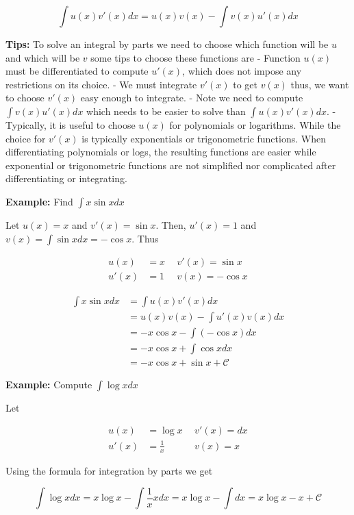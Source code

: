 \documentclass[11pt]{article}
\begin{document}
{\[
\int u(x)v'(x) dx = u(x)v(x) - \int v(x)u'(x)dx
\]

\textbf{Tips:} To solve an integral by parts we need to choose which
function will be \(u\) and which will be \(v\) some tips to choose these
functions are - Function \(u(x)\) must be differentiated to compute
\(u'(x)\), which does not impose any restrictions on its choice. - We
must integrate \(v'(x)\) to get \(v(x)\) thus, we want to choose
\(v'(x)\) easy enough to integrate. - Note we need to compute
\(\int v(x)u'(x)dx\) which needs to be easier to solve than
\(\int u(x)v'(x)dx\). - Typically, it is useful to choose \(u(x)\) for
polynomials or logarithms. While the choice for \(v'(x)\) is typically
exponentials or trigonometric functions. When differentiating
polynomials or logs, the resulting functions are easier while
exponential or trigonometric functions are not simplified nor
complicated after differentiating or integrating.

\textbf{Example:} Find \(\int x\sin x dx\)

Let \(u(x) = x\) and \(v'(x) = \sin x\). Then, \(u'(x) = 1\) and
\(v(x) = \int \sin x dx = -\cos x\). Thus

\[
\begin{align}
u(x) & = x \ & \ v'(x) = \sin x \\
u'(x) & = 1 \ & \ v(x) = -\cos x
\end{align}
\]

\[
\begin{align}
\int x\sin x dx & = \int u(x)v'(x)dx \\
& = u(x)v(x) - \int u'(x)v(x) dx \\
& = -x \cos x - \int (-\cos x) dx \\
& = -x\cos x + \int \cos x dx \\
& = -x \cos x + \sin x + \mathcal{C}
\end{align}
\]

\textbf{Example:} Compute \(\int \log x dx\)

Let

\[
\begin{align}
u(x) & = \log x \ & \ v'(x) = dx \\
u'(x) & = \frac{1}{x} \ & \ v(x) = x
\end{align}
\]

Using the formula for integration by parts we get

\[
\int \log x dx = x\log x - \int \frac{1}{x} x dx = x\log x - \int dx = x\log x - x + \mathcal{C}
\]

}
\end{document}
